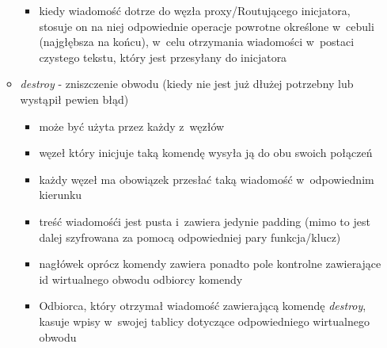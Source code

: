 \begin{itemize}
\begin{itemize}
\begin{itemize}
	    \item kiedy wiadomość dotrze do węzła proxy/Routującego inicjatora, stosuje on na niej odpowiednie operacje powrotne określone w~cebuli (najgłębsza na końcu), w~celu otrzymania wiadomości w~postaci czystego tekstu, który jest przesyłany do inicjatora
	   \end{itemize}
	   \item \textit{destroy} - zniszczenie obwodu (kiedy nie jest już dłużej potrzebny lub wystąpił pewien błąd)
	   \begin{itemize}
	    \item może być użyta przez każdy z~węzłów
	    \item węzeł który inicjuje taką komendę wysyła ją do obu swoich połączeń
	    \item każdy węzeł ma obowiązek przesłać taką wiadomość w~odpowiednim kierunku
	    \item treść wiadomośći jest pusta i~zawiera jedynie padding (mimo to jest dalej szyfrowana za pomocą odpowiedniej pary funkcja/klucz)
	    \item nagłówek oprócz komendy zawiera ponadto pole kontrolne zawierające id wirtualnego obwodu odbiorcy komendy
	    \item Odbiorca, który otrzymał wiadomość zawierającą komendę \textit{destroy}, kasuje wpisy w~swojej tablicy dotyczące odpowiedniego wirtualnego obwodu
	   \end{itemize}

	  \end{itemize}

	\end{itemize}

	
	
